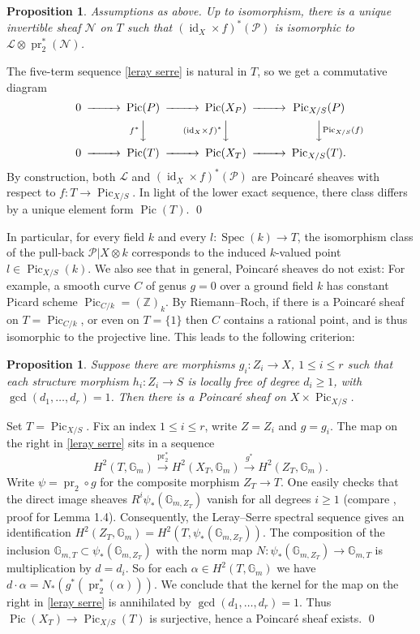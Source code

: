 \documentclass[oneside, 12pt]{amsart}
\newcommand\mylabel[1]{\label{#1}\marginpar{\raggedright\vspace{-1ex}\medskip\medskip\footnotesize \tt #1}}
\renewcommand\mylabel[1]{\label{#1}}
\newtheorem{proposition}[theorem]{Proposition}
\theoremstyle{definition}
\theoremstyle{remark}
\newcommand{\ZZ}{\mathbb{Z}}
\newcommand{\GG}{\mathbb{G}}
\newcommand{\shN}{\mathscr{N}}
\newcommand{\shL}{\mathscr{L}}
\newcommand{\shP}{\mathscr{P}}
\newcommand{\id}{{\operatorname{id}}}
\newcommand{\lra}{\longrightarrow}
\newcommand{\Pic}{\operatorname{Pic}}
\newcommand{\pr}{\operatorname{pr}}
\newcommand{\ra}{\rightarrow}
\newcommand{\Spec}{\operatorname{Spec}}
\begin{document}
\begin{proposition}
\mylabel{unique pullback}
Assumptions as above.
Up to isomorphism,   there is a unique invertible sheaf $\shN$ on $T$ such that
$(\id_X\times f)^*(\shP)$ is isomorphic to $\shL\otimes \pr_2^*(\shN)$.
\end{proposition}

\proof
The five-term sequence \eqref{leray serre} is natural in $T$, so we get a commutative diagram
$$
\begin{CD}
0	@>>>	\Pic(P)	@>>>	\Pic(X_P)	@>>>	\Pic_{X/S}(P)\\
@.		@Vf^*VV		@V(\id_X\times f)^*V V	@VV\Pic_{X/S}(f)V\\
0	@>>>	\Pic(T)	@>>>	\Pic(X_T)	@>>>	\Pic_{X/S}(T).
\end{CD}
$$
By construction, both $\shL$ and $(\id_X\times f)^*(\shP)$ are Poincar\'e sheaves with respect to $f:T\ra\Pic_{X/S}$.
In light of the lower exact sequence, there class  differs by a unique element form $\Pic(T)$.
\qed

\medskip
In particular, for every field $k$ and every $l:\Spec(k)\ra T$, the isomorphism class of the pull-back $\shP|X\otimes k$
corresponds to the induced $k$-valued point $l\in \Pic_{X/S}(k)$.
We also see that in general, Poincar\'e sheaves do not exist: For example, a smooth curve $C$ of genus $g=0$
over a ground field $k$
has constant Picard scheme $\Pic_{C/k}=(\ZZ)_k$. By Riemann--Roch,
if there is a  Poincar\'e sheaf on $T=\Pic_{C/k}$, or even on $T=\{1\}$
then $C$ contains a rational point, and is thus isomorphic to the projective line.
This leads to the following criterion:

\begin{proposition}
\mylabel{for poincare}
Suppose there are morphisms $g_i:Z_i\ra X $, $1\leq i\leq r$ such that each structure morphism $h_i:Z_i\ra S$
is locally free of degree $d_i\geq 1$, with $\gcd(d_1,\ldots,d_r)=1$.
Then there is a Poincar\'e sheaf   on $X\times  \Pic_{X/S}$.
\end{proposition}

\proof
Set $T=\Pic_{X/S}$. Fix an index $1\leq i\leq r$, write  $Z=Z_i$ and $g=g_i$.
The map   on the right in \eqref{leray serre} sits in a sequence
$$
H^2(T,\GG_m)\stackrel{\pr_2^*}{\lra} H^2(X_T,\GG_m)\stackrel{g^*}{\lra} H^2(Z_T,\GG_m).
$$
Write $\psi=\pr_2\circ g$ for the composite morphism $Z_T\ra T$.
One easily  checks that the direct image sheaves $R^i\psi_*(\GG_{m,Z_T})$ vanish for all degrees $i\geq 1$ 
(compare \cite{Schroeer 2020}, proof for Lemma 1.4). 
Consequently, the Leray--Serre spectral sequence   gives an identification 
$H^2(Z_T,\GG_m)=H^2(T,\psi_*(\GG_{m,Z_T}))$. 
The composition of the inclusion $\GG_{m,T}\subset \psi_*(\GG_{m,Z_T})$ with the norm map
$N:\psi_*(\GG_{m,Z_T})\ra\GG_{m,T}$ is multiplication by $d=d_i$.
So for each $\alpha\in H^2(T,\GG_m)$ we have 
$d\cdot\alpha= N_*(g^*(\pr_2^*(\alpha)))$.
We conclude that the kernel for the map on the right in \eqref{leray serre} is annihilated by $\gcd(d_1,\ldots,d_r)=1$.
Thus $\Pic(X_T)\ra\Pic_{X/S}(T)$ is surjective, hence a Poincar\'e sheaf exists. 
\qed
\end{document}
